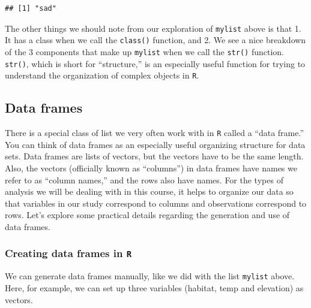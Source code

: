 \documentclass[]{book}
\begin{document}
\begin{verbatim}
## [1] "sad"
\end{verbatim}

The other things we should note from our exploration of \texttt{mylist} above is that 1. It has a class when we call the \texttt{class()} function, and 2. We see a nice breakdown of the 3 components that make up \texttt{mylist} when we call the \texttt{str()} function. \texttt{str()}, which is short for ``structure,'' is an especially useful function for trying to understand the organization of complex objects in \texttt{R}.

\hypertarget{data-frames}{%
\subsection{Data frames}\label{data-frames}}

There is a special class of list we very often work with in \texttt{R} called a ``data frame.'' You can think of data frames as an especially useful organizing structure for data sets. Data frames are lists of vectors, but the vectors have to be the same length. Also, the vectors (officially known as ``columns'') in data frames have names we refer to as ``column names,'' and the rows also have names. For the types of analysis we will be dealing with in this course, it helps to organize our data so that variables in our study correspond to columns and observations correspond to rows. Let's explore some practical details regarding the generation and use of data frames.

\hypertarget{creating-data-frames-in-r}{%
\subsubsection{\texorpdfstring{Creating data frames in \texttt{R}}{Creating data frames in R}}\label{creating-data-frames-in-r}}

We can generate data frames manually, like we did with the list \texttt{mylist} above. Here, for example, we can set up three variables (habitat, temp and elevation) as vectors.
\end{document}

